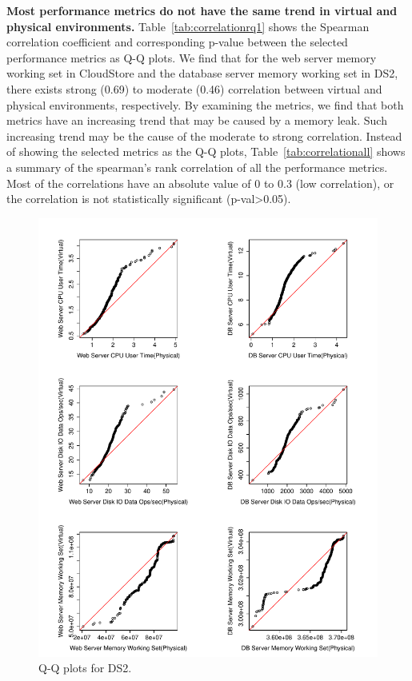\textbf{Most performance metrics do not have the same trend in virtual and physical environments.} Table~\ref{tab:correlationrq1} shows the Spearman correlation coefficient and corresponding p-value between the selected performance metrics as Q-Q plots. We find that for the web server memory working set in CloudStore and the database server memory working set in DS2, there exists strong (0.69) to moderate (0.46) correlation between virtual and physical environments, respectively. By examining the metrics, we find that both metrics have an increasing trend that may be caused by a memory leak. Such increasing trend may be the cause of the moderate to strong correlation. Instead of showing the selected metrics as the Q-Q plots, Table~\ref{tab:correlationall} shows a summary of the spearman's rank correlation of all the performance metrics. Most of the correlations have an absolute value of 0 to 0.3 (low correlation), or the correlation is not statistically significant (p-val\textgreater0.05).


\noindent{}


\begin{figure}[thb]
	\centering
	\includegraphics[width=0.9\columnwidth]{figures/ds2_qq_red.pdf}
	\caption{Q-Q plots for DS2.}
	\label{fig:qqds2}
\end{figure}



